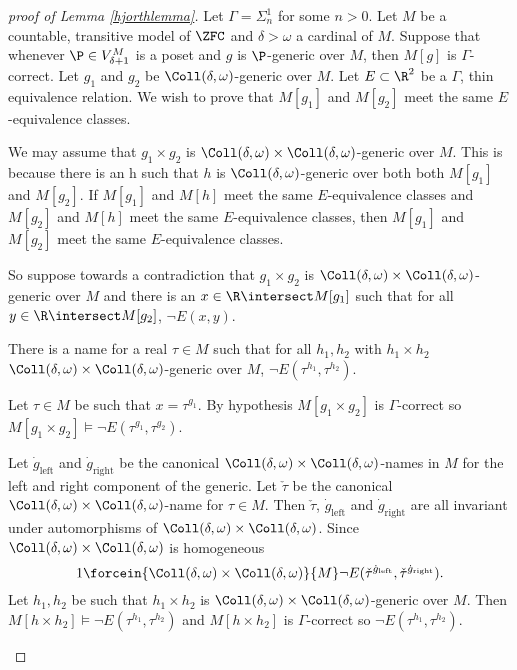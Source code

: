 \documentclass[oneside,12pt]{amsart}
\begin{document}
\begin{proof}[proof of Lemma \ref{hjorthlemma}]
Let $\Gamma = \Sigma^1_n$ for some $n>0$.
Let $M$ be a countable, transitive model of $\ZFC$ and  $\delta>\omega$ a cardinal of $M$.
Suppose that whenever $\P\in V^M_{\delta+1}$ is a poset and $g$ is $\P$-generic over $M$, then
$M[g]$ is $\Gamma$-correct. Let $g_1$ and $g_2$ be $\Coll(\delta,\omega)$-generic over $M$.
Let $E\subset\R^2$ be a $\Gamma$, thin equivalence relation.
We wish to prove that $M[g_1]$ and $M[g_2]$ meet the same $E$-equivalence classes.

We may assume that $g_1\times g_2$ is $\Coll(\delta,\omega)\times \Coll(\delta,\omega)$-generic over $M$.
This is because there is an h such that $h$ is $\Coll(\delta,\omega)$-generic over both
both $M[g_1]$ and $M[g_2]$. If $M[g_1]$ and $M[h]$ meet the same $E$-equivalence classes and
$M[g_2]$ and $M[h]$ meet the same $E$-equivalence classes, then
$M[g_1]$ and $M[g_2]$ meet the same $E$-equivalence classes.

So suppose towards a contradiction that $g_1\times g_2$ is $\Coll(\delta,\omega)\times \Coll(\delta,\omega)$-generic over $M$
and there is an $x\in\R\intersect M[g_1]$ such that for all $y\in \R\intersect M[g_2]$, $\neg E(x,y)$.

\begin{claim}[Claim 1]
There is a name for a real $\tau\in M$ such that for all $h_1,h_2$
with $h_1\times h_2$ $\Coll(\delta,\omega)\times \Coll(\delta,\omega)$-generic over $M$,
$\neg E(\tau^{h_1},\tau^{h_2})$.
\end{claim}
\begin{subproof}
Let $\tau\in M$ be such that $x=\tau^{g_1}$. By hypothesis $M[g_1\times g_2]$ is $\Gamma$-correct
so $M[g_1\times g_2]\models \neg E(\tau^{g_1},\tau^{g_2})$.

Let $\dot{g}_{\text{left}}$ and $\dot{g}_{\text{right}}$
be the canonical $\Coll(\delta,\omega)\times \Coll(\delta,\omega)$-names in $M$ for the left and right component of the generic.
Let $\check{\tau}$ be the canonical $\Coll(\delta,\omega)\times \Coll(\delta,\omega)$-name for $\tau\in M$.
Then $\check{\tau}$, $\dot{g}_{\text{left}}$ and $\dot{g}_{\text{right}}$ are all invariant under automorphisms of $\Coll(\delta,\omega)\times \Coll(\delta,\omega)$.
Since $\Coll(\delta,\omega)\times \Coll(\delta,\omega)$ is homogeneous
$$1\forcein{\Coll(\delta,\omega)\times \Coll(\delta,\omega)}{M} \neg E(\check{\tau}^{\dot{g}_{\text{left}}},\check{\tau}^{\dot{g}_{\text{right}}}).$$
Let $h_1,h_2$ be such that $h_1\times h_2$ is $\Coll(\delta,\omega)\times \Coll(\delta,\omega)$-generic over $M$.
Then $M[h\times h_2]\models \neg E(\tau^{h_1},\tau^{h_2})$ and $M[h\times h_2]$ is $\Gamma$-correct so $\neg E(\tau^{h_1},\tau^{h_2})$.
\end{subproof}


\end{proof}
\end{document}
